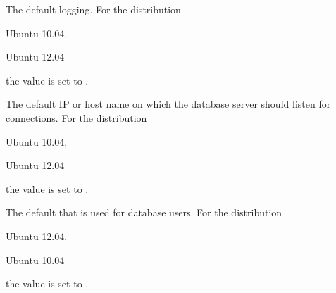 
The default  logging.
For the distribution
\begin{inparaitem}
\item[\TheDistribution{ubuntu}] Ubuntu 10.04,
\item[\TheDistribution{ubuntu}] Ubuntu 12.04
\end{inparaitem}
the value is set to .


The default IP  or host name on which the database server should
listen for connections. For the distribution
\begin{inparaitem}
\item[\TheDistribution{ubuntu}] Ubuntu 10.04,
\item[\TheDistribution{ubuntu}] Ubuntu 12.04
\end{inparaitem}
the value is set to .
 

The default  that is used for database users.
For the distribution
\begin{inparaitem}
\item[\TheDistribution{ubuntu}] Ubuntu 12.04,
\item[\TheDistribution{ubuntu}] Ubuntu 10.04
\end{inparaitem}
the value is set to .
 
